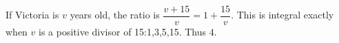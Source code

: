 If Victoria is $v$ years old, the ratio is $\dfrac{v+15}{v}=1+\dfrac{15}{v}$. This is integral exactly when $v$ is a positive divisor of 15:1,3,5,15. Thus $\boxed4$.
